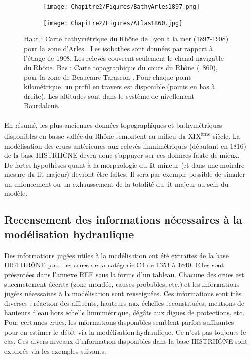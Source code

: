 	\begin{figure}[h]
		\centering
		\begin{subfigure}{.7\linewidth}
			\texttt{[image: Chapitre2/Figures/BathyArles1897.png]}
		\end{subfigure}
		
		\vspace{10pt}
		
		\begin{subfigure}{0.7\linewidth}
			\texttt{[image: Chapitre2/Figures/Atlas1860.jpg]}
		\end{subfigure}
		\caption{Haut : Carte bathymétrique du Rhône de Lyon à la mer (1897-1908) pour la zone d'Arles \citep{cnr_cartes_1908}. Les isobathes sont données par rapport à l'étiage de 1908. Les relevés couvrent seulement le chenal navigable du Rhône. Bas : Carte topographique du cours du Rhône (1860), pour la zone de Beaucaire-Tarascon \citep{cnr_carte_1876}. Pour chaque point kilométrique, un profil en travers est disponible (points en bas à droite). Les altitudes sont dans le système de nivellement Bourdalouë.}
		\label{fig:BathyTopo}
	\end{figure}
	
	\paragraph{} En résumé, les plus anciennes données topographiques et bathymétriques disponibles en basse vallée du Rhône remontent au milieu du XIX\textsuperscript{ème} siècle. La modélisation des crues antérieures aux relevés limnimétriques (débutant en 1816) de la base HISTRHÔNE devra donc s'appuyer sur ces données faute de mieux. De fortes hypothèses quant à la morphologie du lit mineur (et dans une moindre mesure du lit majeur) devront être faites. Il sera par exemple possible de simuler un enfoncement ou un exhaussement de la totalité du lit majeur au sein du modèle. 
	
\FloatBarrier	
	
	\subsection{Recensement des informations nécessaires à la modélisation hydraulique} 
	
	\paragraph{} Des informations jugées utiles à la modélisation ont été extraites de la base HISTHRÔNE pour les crues de la catégorie C4 de 1353 à 1840. Elles sont présentées dans l'annexe REF sous la forme d'un tableau. Chacune des crues est succinctement décrite (zone inondée, causes probables, etc.) et les informations jugées nécessaires à la modélisation sont renseignées. Ces informations sont très diverses : réaction des affluents, hauteurs aux échelles reconstituées, mentions de hauteurs d'eau hors échelle limnimétrique, dégâts aux digues de protections, etc. Pour certaines crues, les informations disponibles semblent parfois suffisantes pour en estimer le débit via la modélisation hydraulique. Ce n'est pas toujours le cas. Ces divers niveaux d'information disponibles dans la base HISTRHÔNE sont explorés via les exemples suivants. 
	
